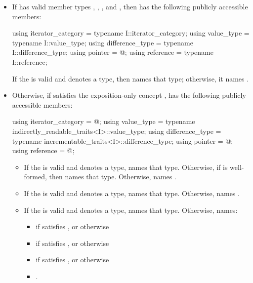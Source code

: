 \begin{itemize}
\item
If  has valid member
types , ,
, and ,
then
has the following publicly accessible members:
\begin{codeblock}
using iterator_category = typename I::iterator_category;
using value_type        = typename I::value_type;
using difference_type   = typename I::difference_type;
using pointer           = @\seebelow@;
using reference         = typename I::reference;
\end{codeblock}
If the   is valid and
denotes a type, then  names that type;
otherwise, it names .

\item
Otherwise, if  satisfies the exposition-only concept
,
 has the following
publicly accessible members:
\begin{codeblock}
using iterator_category = @\seebelow@;
using value_type        = typename indirectly_readable_traits<I>::value_type;
using difference_type   = typename incrementable_traits<I>::difference_type;
using pointer           = @\seebelow@;
using reference         = @\seebelow@;
\end{codeblock}
\begin{itemize}
\item If the   is valid and denotes a type,
 names that type. Otherwise, if
 is well-formed, then
 names that type. Otherwise, 
names .

\item If the   is valid and denotes a
type,  names that type. Otherwise, 
names .

\item If the   is valid and
denotes a type,  names that type.
Otherwise,  names:
\begin{itemize}
\item
{}
if
 satisfies ,
or otherwise
\item
{} if
 satisfies ,
or otherwise
\item
{} if
 satisfies ,
or otherwise
\item
{}.
\end{itemize}
\end{itemize}


\end{itemize}
